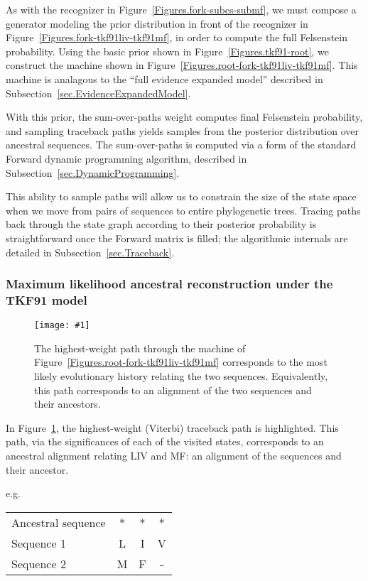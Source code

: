 \documentclass{article}
\newcommand{\secref}[1]{Subsection~\ref{sec.#1}}
\newcommand{\figref}[1]{Figure~\ref{Figures.#1}}
\newcommand{\figlabel}[1]{\label{Figures.#1}}
\newcommand{\easyfig}[4]{
\begin{figure}
\texttt{[image: \#1]}
\caption{ \figlabel{#3} #4}
\end{figure}}
\newcommand{\widepngfig}[2]{\easyfig{#1.png}{width=\textwidth}{#1}{#2}}
\begin{document}
As with the recognizer in \figref{fork-subcs-submf},
we must compose a generator modeling the prior distribution in front of the recognizer in \figref{fork-tkf91liv-tkf91mf}, in order to compute
the full Felsenstein probability.  
Using the basic prior shown in \figref{tkf91-root}, we construct the machine shown
in \figref{root-fork-tkf91liv-tkf91mf}.  
This machine is analagous to the ``full evidence expanded model'' described in
\secref{EvidenceExpandedModel}.  

With this prior, the sum-over-paths weight computes final Felsenstein probability, and 
sampling traceback paths yields samples from the  posterior distribution 
over ancestral sequences.  
The sum-over-paths is computed via a form of the standard Forward dynamic programming
algorithm, described in \secref{DynamicProgramming}.  

This ability to sample paths will allow us to constrain
the size of the state space when we move from  pairs of 
sequences to entire phylogenetic trees.  
Tracing paths back through the state graph according to their posterior probability
is straightforward once the Forward matrix is filled; 
the algorithmic internals are detailed in \secref{Traceback}. 



\subsubsection{Maximum likelihood ancestral reconstruction under the TKF91 model}

\widepngfig{viterbi-root-fork-tkf91liv-tkf91mf}{The highest-weight path through
the machine of \figref{root-fork-tkf91liv-tkf91mf}
 corresponds to the most likely evolutionary history relating the two sequences.  
Equivalently, this path corresponds to an alignment of the two sequences and their 
ancestors.}

In \figref{viterbi-root-fork-tkf91liv-tkf91mf}, the highest-weight (Viterbi) traceback path
is highlighted.  
This path, via the significances of each of the visited states, corresponds to 
an ancestral alignment relating LIV and MF: an alignment of the sequences and their ancestor.

e.g.
\begin{tabular}{lccc}
Ancestral sequence & * & * & * \\
Sequence 1         & L & I & V \\
Sequence 2         & M & F & -
\end{tabular}
\end{document}
